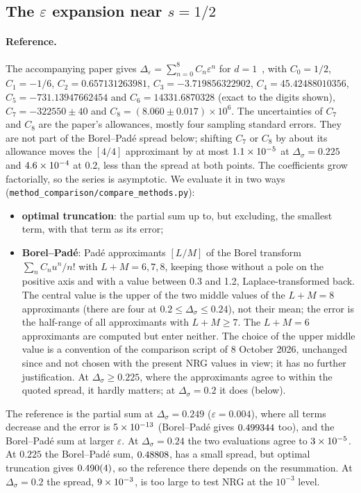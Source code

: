 \documentclass[10pt,a4paper]{article}
\newcommand{\Ds}{\Delta_\sigma}
\newcommand{\De}{\Delta_\varepsilon}
\newcommand{\code}[1]{\texttt{#1}}
\begin{document}
\subsection{The \texorpdfstring{$\varepsilon$}{epsilon} expansion near \texorpdfstring{$s=1/2$}{s = 1/2}}\label{sec:series}
\paragraph{Reference.} The accompanying paper gives $\De=\sum_{n=0}^{8}C_n\varepsilon^n$ for $d=1$~\cite{Paper}, with
$C_0=1/2$, $C_1=-1/6$, $C_2=0.657131263981$, $C_3=-3.719856322902$, $C_4=45.42488010356$, $C_5=-731.13947662454$ and
$C_6=14331.6870328$ (exact to the digits shown), $C_7=-322550\pm40$ and $C_8=(8.060\pm0.017)\times10^6$. The uncertainties of $C_7$
and $C_8$ are the paper's allowances, mostly four sampling standard errors. They are not part of the Borel--Pad\'e spread below;
shifting $C_7$ or $C_8$ by about its allowance moves the $[4/4]$ approximant by at most $1.1\times10^{-5}$ at $\Ds=0.225$ and
$4.6\times10^{-4}$ at $0.2$, less than the spread at both points. The coefficients grow factorially, so the series is asymptotic.
We evaluate it in two ways (\code{method\_comparison/compare\_methods.py}):
\begin{itemize}
\item \textbf{optimal truncation}: the partial sum up to, but excluding, the smallest term, with that term as its error;
\item \textbf{Borel--Pad\'e}: Pad\'e approximants $[L/M]$ of the Borel transform $\sum_nC_nu^n/n!$ with $L+M=6,7,8$, keeping those
  without a pole on the positive axis and with a value between 0.3 and 1.2, Laplace-transformed back. The central value is the upper
  of the two middle values of the $L+M=8$ approximants (there are four at $0.2\le\Ds\le0.24$), not their mean; the error is the
  half-range of all approximants with $L+M\ge7$. The $L+M=6$ approximants are computed but enter neither. The choice of the upper
  middle value is a convention of the comparison script of 8 October 2026, unchanged since and not chosen with the present NRG values
  in view; it has no further justification. At $\Ds\ge0.225$, where the approximants agree to within the quoted spread, it hardly
  matters; at $\Ds=0.2$ it does (below).
\end{itemize}
The reference is the partial sum at $\Ds=0.249$ ($\varepsilon=0.004$), where all terms decrease and the error is
$5\times10^{-13}$ (Borel--Pad\'e gives $0.499344$ too), and the Borel--Pad\'e sum at larger $\varepsilon$. At
$\Ds=0.24$ the two evaluations agree to $3\times10^{-5}$. At $0.225$ the Borel--Pad\'e sum, $0.48808$, has a small
spread, but optimal truncation gives $0.490(4)$, so the reference there depends on the resummation. At $\Ds=0.2$ the
spread, $9\times10^{-3}$, is too large to test NRG at the $10^{-3}$ level.
\end{document}
